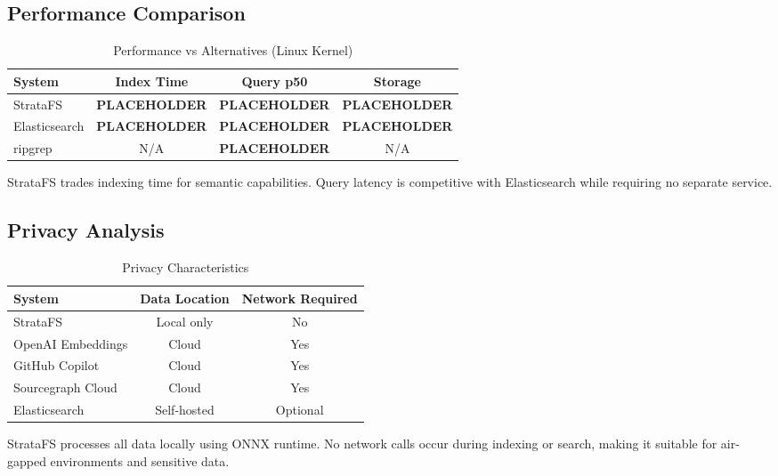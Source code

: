\documentclass[conference]{IEEEtran}
\begin{document}
\subsection{Performance Comparison}

\begin{table}[htbp]
\caption{Performance vs Alternatives (Linux Kernel)}
\begin{center}
\begin{tabular}{lccc}
\toprule
\textbf{System} & \textbf{Index Time} & \textbf{Query p50} & \textbf{Storage} \\
\midrule
StrataFS & \textbf{PLACEHOLDER} & \textbf{PLACEHOLDER} & \textbf{PLACEHOLDER} \\
Elasticsearch & \textbf{PLACEHOLDER} & \textbf{PLACEHOLDER} & \textbf{PLACEHOLDER} \\
ripgrep & N/A & \textbf{PLACEHOLDER} & N/A \\
\bottomrule
\end{tabular}
\label{tab:perf_compare}
\end{center}
\end{table}

StrataFS trades indexing time for semantic capabilities. Query latency is competitive with Elasticsearch while requiring no separate service.

\subsection{Privacy Analysis}

\begin{table}[htbp]
\caption{Privacy Characteristics}
\begin{center}
\begin{tabular}{lcc}
\toprule
\textbf{System} & \textbf{Data Location} & \textbf{Network Required} \\
\midrule
StrataFS & Local only & No \\
OpenAI Embeddings & Cloud & Yes \\
GitHub Copilot & Cloud & Yes \\
Sourcegraph Cloud & Cloud & Yes \\
Elasticsearch & Self-hosted & Optional \\
\bottomrule
\end{tabular}
\label{tab:privacy}
\end{center}
\end{table}

StrataFS processes all data locally using ONNX runtime. No network calls occur during indexing or search, making it suitable for air-gapped environments and sensitive data.
\end{document}
